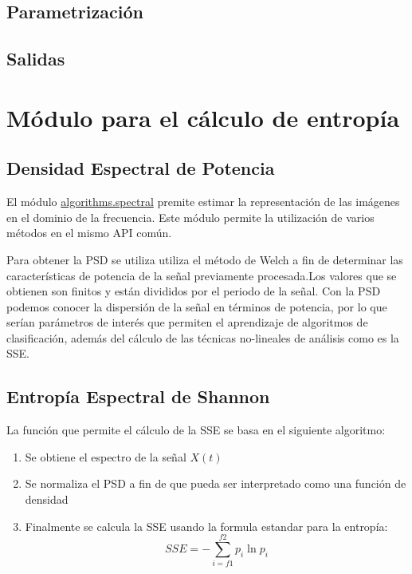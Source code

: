 \subsection{Parametrización}
\subsection{Salidas}
\section{Módulo para el cálculo de entropía}

\subsection{Densidad Espectral de Potencia}

El módulo \href{http://nipy.org/nitime/api/generated/nitime.algorithms.spectral.html}{algorithms.spectral} premite estimar la representación de las imágenes en el dominio de la frecuencia. Este módulo permite la utilización de varios métodos en el mismo API común.


Para obtener la PSD se utiliza utiliza el método de Welch a fin de determinar las características de potencia de la señal previamente procesada.Los valores que se obtienen son finitos y están divididos por el periodo de la señal. Con la PSD podemos conocer la dispersión de la señal en términos de potencia, por lo que serían parámetros de interés que permiten el aprendizaje de algoritmos de clasificación, además del cálculo de las técnicas no-lineales de análisis como es la SSE.

\subsection{Entropía Espectral de Shannon}

La función que permite el cálculo de la SSE se basa en el siguiente algoritmo:

\begin{enumerate}
	\item Se obtiene el espectro de la señal $X(t)$
	\item Se normaliza el PSD a fin de que pueda ser interpretado como una función de densidad
	\item Finalmente se calcula la SSE usando la formula estandar para la entropía: 
	$$SSE=-\sum_{i=f1}^{f2}p_{i}\ln{p_{i}}$$
\end{enumerate}

